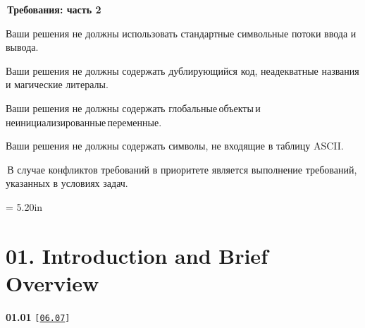 \documentclass[a4paper,12pt]{article}
\renewenvironment{itemize}
{
    \begin{list}{\labelitemi}
    {
      \setlength{\topsep}{0pt}
      \setlength{\partopsep}{0pt}
      \setlength{\parskip}{0pt}
      \setlength{\itemsep}{0pt}
      \setlength{\parsep}{0pt}
      \setlength{\leftmargin}{14.5pt}
    }
}{\end{list}}
\begin{document}
\bigskip

\,\textbf{Требования: часть 2}

\medskip

\begin{itemize}

    \item Ваши решения не должны использовать стандартные символьные потоки ввода и вывода.

    \smallskip

    \item Ваши решения не должны содержать дублирующийся код, неадекватные названия и магические литералы.

    \smallskip

    \item Ваши решения не должны содержать глобальные\,объекты\,и\,неинициализированные\,переменные. 

    \smallskip

    \item Ваши решения не должны содержать символы, не входящие в таблицу ASCII. 

\end{itemize}

\bigskip

\,В случае конфликтов требований в приоритете является выполнение требований, указанных в условиях задач.



\newpage\thispagestyle{empty}\pdfpageheight = 5.20in

\section{01. Introduction and Brief Overview}

{\large \textbf{01.01} \texttt{[\href{https://github.com/i-s-m-mipt/Education/blob/master/projects/examples/source/06.07.cpp}{\texttt{06.07}}]}} 

\bigskip
\end{document}
